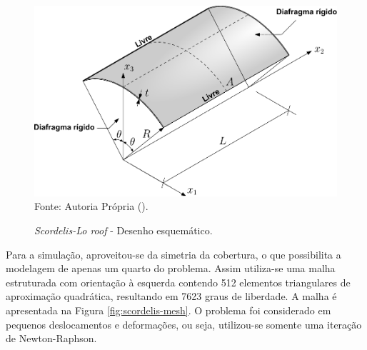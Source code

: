 \begin{figure}[h!]
    \centering
    \caption{\textit{Scordelis-Lo roof} - Desenho esquemático.}
    \includegraphics[width=0.75\linewidth]{Figuras/scordelis/scordelis_lo.pdf}
    \\Fonte: Autoria Própria (\the\year).
    \label{fig:scordelis}
\end{figure}

Para a simulação, aproveitou-se da simetria da cobertura, o que possibilita a modelagem de apenas um quarto do problema. Assim utiliza-se uma malha estruturada com orientação à esquerda contendo 512 elementos triangulares de aproximação quadrática, resultando em 7623 graus de liberdade. A malha é apresentada na Figura \ref{fig:scordelis-mesh}. O problema foi considerado em pequenos deslocamentos e deformações, ou seja, utilizou-se somente uma iteração de Newton-Raphson.

